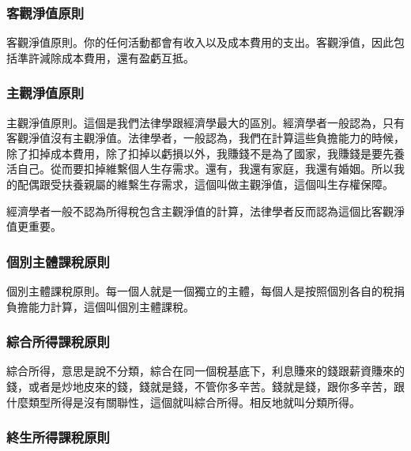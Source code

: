 \documentclass[oneside,sub3section]{ctexbook}
\begin{document}
\hypertarget{ux5ba2ux89c0ux6de8ux503cux539fux5247}{%
\subsubsection{客觀淨值原則}\label{ux5ba2ux89c0ux6de8ux503cux539fux5247}}

客觀淨值原則。你的任何活動都會有收入以及成本費用的支出。客觀淨值，因此包括準許減除成本費用，還有盈虧互抵。

\hypertarget{ux4e3bux89c0ux6de8ux503cux539fux5247}{%
\subsubsection{主觀淨值原則}\label{ux4e3bux89c0ux6de8ux503cux539fux5247}}

主觀淨值原則。這個是我們法律學跟經濟學最大的區別。經濟學者一般認為，只有客觀淨值沒有主觀淨值。法律學者，一般認為，我們在計算這些負擔能力的時候，除了扣掉成本費用，除了扣掉以虧損以外，我賺錢不是為了國家，我賺錢是要先養活自己。從而要扣掉維繫個人生存需求。還有，我還有家庭，我還有婚姻。所以我的配偶跟受扶養親屬的維繫生存需求，這個叫做主觀淨值，這個叫生存權保障。

經濟學者一般不認為所得稅包含主觀淨值的計算，法律學者反而認為這個比客觀淨值更重要。

\hypertarget{ux500bux5225ux4e3bux9ad4ux8ab2ux7a05ux539fux5247}{%
\subsubsection{個別主體課稅原則}\label{ux500bux5225ux4e3bux9ad4ux8ab2ux7a05ux539fux5247}}

個別主體課稅原則。每一個人就是一個獨立的主體，每個人是按照個別各自的稅捐負擔能力計算，這個叫個別主體課稅。

\hypertarget{ux7d9cux5408ux6240ux5f97ux8ab2ux7a05ux539fux5247}{%
\subsubsection{綜合所得課稅原則}\label{ux7d9cux5408ux6240ux5f97ux8ab2ux7a05ux539fux5247}}

綜合所得，意思是說不分類，綜合在同一個稅基底下，利息賺來的錢跟薪資賺來的錢，或者是炒地皮來的錢，錢就是錢，不管你多辛苦。錢就是錢，跟你多辛苦，跟什麼類型所得是沒有關聯性，這個就叫綜合所得。相反地就叫分類所得。

\hypertarget{ux7d42ux751fux6240ux5f97ux8ab2ux7a05ux539fux5247}{%
\subsubsection{終生所得課稅原則}\label{ux7d42ux751fux6240ux5f97ux8ab2ux7a05ux539fux5247}}
\end{document}
